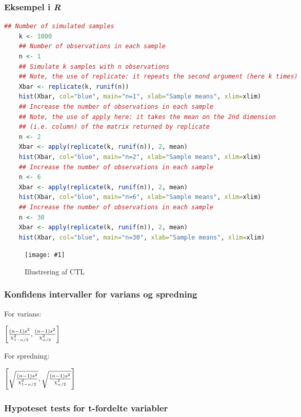 \documentclass{article}
\newcommand{\mellemrum}{\vspace{2 ex}}
\newcommand{\pic}[3]{\begin{figure}[H]
		\centering
		\texttt{[image: \#1]}
		
		\caption{#2}
\end{figure}}
\newcommand{\cent}[1]{ \mellemrum \begin{center} #1\end{center} \mellemrum }
\newcommand{\bracket}[1]{\mathopen{}\left[ {#1}_{{}_{}}\,\negthickspace\right]\mathclose{}}
\begin{document}
	
	\subsubsection*{Eksempel i \textit{R}}
	
	\begin{lstlisting}[language=R]
	## Number of simulated samples
	k <- 1000
	## Number of observations in each sample
	n <- 1
	## Simulate k samples with n observations
	## Note, the use of replicate: it repeats the second argument (here k times)
	Xbar <- replicate(k, runif(n))
	hist(Xbar, col="blue", main="n=1", xlab="Sample means", xlim=xlim)
	## Increase the number of observations in each sample
	## Note, the use of apply here: it takes the mean on the 2nd dimension
	## (i.e. column) of the matrix returned by replicate
	n <- 2
	Xbar <- apply(replicate(k, runif(n)), 2, mean)
	hist(Xbar, col="blue", main="n=2", xlab="Sample means", xlim=xlim)
	## Increase the number of observations in each sample
	n <- 6
	Xbar <- apply(replicate(k, runif(n)), 2, mean)
	hist(Xbar, col="blue", main="n=6", xlab="Sample means", xlim=xlim)
	## Increase the number of observations in each sample
	n <- 30
	Xbar <- apply(replicate(k, runif(n)), 2, mean)
	hist(Xbar, col="blue", main="n=30", xlab="Sample means", xlim=xlim)\end{lstlisting}
	
	\pic{CTL}{Illustrering af CTL}{\linewidth}
	
	\pagebreak
	
	
	\subsubsection{Konfidens intervaller for varians og spredning}
	
	For varians:
	
	\cent{$ \bracket{\frac{(n-1)s^2}{\chi_{1-\alpha/2}^2}, \frac{(n-1)s^2}{\chi_{\alpha/2}^2}} $}
	
	For spredning:
	
	\cent{$ \bracket{\sqrt{\frac{(n-1)s^2}{\chi_{1-\alpha/2}^2}}, \sqrt{\frac{(n-1)s^2}{\chi_{\alpha/2}^2}}} $}
	
	\subsubsection{Hypoteset tests for t-fordelte variabler}
	
\end{document}
